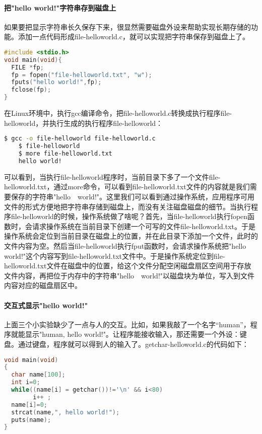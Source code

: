 \paragraph{把"hello world!"字符串存到磁盘上}

如果要把显示字符串长久保存下来，很显然需要磁盘外设来帮助实现长期存储的功能。添加一点代码形成file-helloworld.c，就可以实现把字符串保存到磁盘上了。

\begin{lstlisting}[language={C}]
#include <stdio.h>
void main(void){
  FILE *fp;
  fp = fopen("file-helloworld.txt", "w");
  fputs("hello world!",fp);
  fclose(fp);
}
\end{lstlisting}

在Linux环境中，执行gcc编译命令，把file-helloworld.c转换成执行程序file-helloworld，并执行生成的执行程序file-helloworld：
\begin{lstlisting}[language={bash}]
	$ gcc -o file-helloworld file-helloworld.c
	$ file-helloworld
	$ more file-helloworld.txt
	hello world!	
\end{lstlisting}

可以看到，当执行file-helloworld程序时，当前目录下多了一个文件file-helloworld.txt，通过more命令，可以看到file-helloworld.txt文件的内容就是我们需要保存的字符串"hello　world!"。这里我们可以看到通过操作系统，应用程序可用文件的形式方便地把字符串存储到磁盘上，而没有关注磁盘磁盘的细节。当执行程序file-helloworld的时候，操作系统做了啥呢？首先，当file-helloworld执行fopen函数时，会请求操作系统在当前目录下创建一个可写的文件file-helloworld.txt。于是操作系统会定位到当前目录在磁盘上的位置，并在此目录下添加一个文件，此时的文件内容为空。然后当file-helloworld执行fput函数时，会请求操作系统把"hello　world!"这个内容写到file-helloworld.txt文件中。于是操作系统定位到file-helloworld.txt文件在磁盘中的位置，给这个文件分配空闲磁盘扇区空间用于存放文件内容，再把位于内存中的字符串"hello　world!"以磁盘块为单位，写入到文件内容对应的磁盘扇区中。



\paragraph{交互式显示"hello world!"}

上面三个小实验缺少了一点与人的交互。比如，如果我敲了一个名字“human”，程序就能显示"human, hello world!"。让程序能接收输入，那还需要一个外设：键盘。通过键盘，程序就可以得到人的输入了。getchar-helloworld.c的代码如下：

\begin{lstlisting}[language={C}]
void main(void)
{
  char name[100];
  int i=0;
  while((name[i] = getchar())!='\n' && i<80)
        i++ ;
  name[i]=0;
  strcat(name,", hello world!");
  puts(name);
}
\end{lstlisting}

